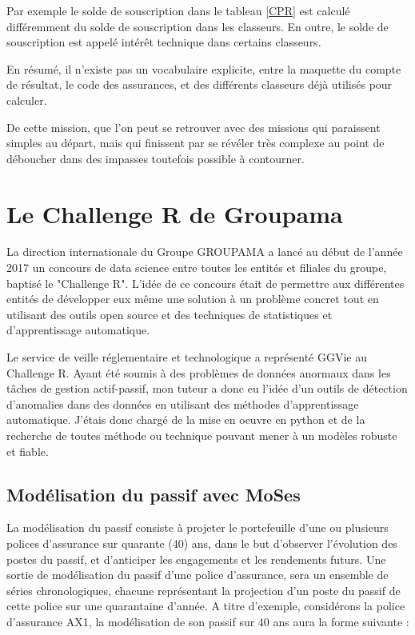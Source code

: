 
Par exemple le solde de souscription dans le tableau \ref{CPR} est calculé différemment du solde de souscription dans les classeurs. En outre, le solde de souscription est appelé intérêt technique dans certains classeurs.

En résumé, il n'existe pas un vocabulaire explicite, entre la maquette du compte de résultat, le code des assurances, et des différents classeurs déjà utilisés pour calculer.

De cette mission, que l'on peut se retrouver avec des missions qui paraissent simples au départ, mais qui finissent par se révéler très complexe au point de déboucher dans des impasses toutefois possible à contourner.

\chapter{Le Challenge R de Groupama}

La direction internationale du Groupe GROUPAMA a lancé au début de l'année 2017 un concours de data science entre toutes les entités et filiales du groupe, baptisé le "Challenge R". L'idée de ce concours était de permettre aux différentes entités de développer eux même une solution à un problème concret tout en utilisant des outils open source et des techniques de statistiques et d'apprentissage automatique.

Le service de veille réglementaire et technologique a représenté GGVie au Challenge R. Ayant été soumis à des problèmes de données anormaux dans les tâches de gestion actif-passif, mon tuteur a donc eu l'idée d'un outils de détection d'anomalies dans des données en utilisant des méthodes d'apprentissage automatique. J'étais donc chargé de la mise en oeuvre en python et de la recherche de toutes méthode ou technique pouvant mener à un modèles robuste et fiable.

\section{Modélisation du passif avec MoSes}

La modélisation du passif consiste à projeter le portefeuille d'une ou plusieurs polices d'assurance sur quarante (40) ans, dans le but d’observer l'évolution des postes du passif, et d'anticiper les engagements et les rendements futurs.
Une sortie de modélisation du passif d'une police d'assurance, sera un ensemble de séries chronologiques, chacune représentant la projection d'un poste du passif de cette police sur une quarantaine d'année. 
A titre d'exemple, considérons la police d'assurance AX1, la modélisation de son passif sur 40 ans aura la forme suivante :

